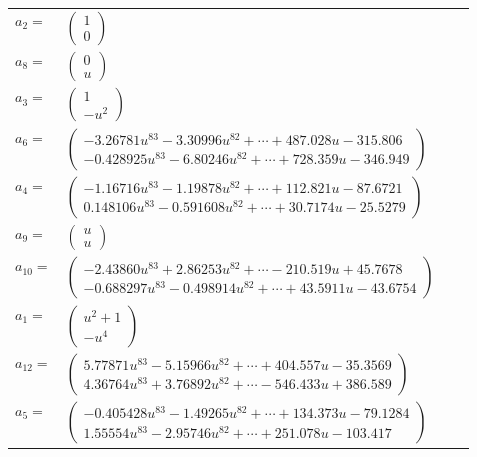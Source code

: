 \documentclass[1p]{elsarticle_modified}
\theoremstyle{definition}
\begin{document}
\begin{tabular}{m{7pt} m{180pt} m{7pt} m{180pt} }
\flushright $a_{2}=$&$\begin{pmatrix}1\\0\end{pmatrix}$ \\
\flushright $a_{8}=$&$\begin{pmatrix}0\\u\end{pmatrix}$ \\
\flushright $a_{3}=$&$\begin{pmatrix}1\\- u^2\end{pmatrix}$ \\
\flushright $a_{6}=$&$\begin{pmatrix}-3.26781 u^{83}-3.30996 u^{82}+\cdots+487.028 u-315.806\\-0.428925 u^{83}-6.80246 u^{82}+\cdots+728.359 u-346.949\end{pmatrix}$ \\
\flushright $a_{4}=$&$\begin{pmatrix}-1.16716 u^{83}-1.19878 u^{82}+\cdots+112.821 u-87.6721\\0.148106 u^{83}-0.591608 u^{82}+\cdots+30.7174 u-25.5279\end{pmatrix}$ \\
\flushright $a_{9}=$&$\begin{pmatrix}u\\u\end{pmatrix}$ \\
\flushright $a_{10}=$&$\begin{pmatrix}-2.43860 u^{83}+2.86253 u^{82}+\cdots-210.519 u+45.7678\\-0.688297 u^{83}-0.498914 u^{82}+\cdots+43.5911 u-43.6754\end{pmatrix}$ \\
\flushright $a_{1}=$&$\begin{pmatrix}u^2+1\\- u^4\end{pmatrix}$ \\
\flushright $a_{12}=$&$\begin{pmatrix}5.77871 u^{83}-5.15966 u^{82}+\cdots+404.557 u-35.3569\\4.36764 u^{83}+3.76892 u^{82}+\cdots-546.433 u+386.589\end{pmatrix}$ \\
\flushright $a_{5}=$&$\begin{pmatrix}-0.405428 u^{83}-1.49265 u^{82}+\cdots+134.373 u-79.1284\\1.55554 u^{83}-2.95746 u^{82}+\cdots+251.078 u-103.417\end{pmatrix}$ \\

\end{tabular}
\end{document}

